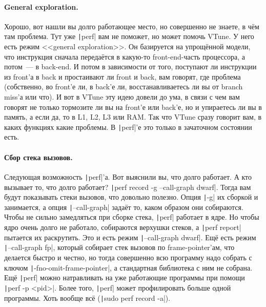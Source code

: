 \documentclass{article}
\begin{document}
    \paragraph{General exploration.}
    Хорошо, вот нашли вы долго работающее место, но совершенно не знаете, в чём там проблема. Тут уже \texttt|perf| вам не поможет, но может помочь VTune. У него есть режим <<general exploration>>. Он базируется на упрощённой модели, что инструкция сначала передаётся в какую-то front-end-часть процессора, а потом~--- в back-end. И потом в зависимости от того, поступают ли инструкции из front'а в back и простаивают ли front и back, вам говорят, где проблема (собственно, во front'е ли, в back'е ли, восстанавливаетесь ли вы от branch miss'а или что). И вот в VTune эту идею довели до ума, в связи с чем вам говорят не только тормозите ли вы на front'е или back'е, но и упираетесь ли вы в память, а если да, то в L1, L2, L3 или RAM. Так что VTune сразу говорит вам, в каких функциях какие проблемы. В \texttt|perf|'е это только в зачаточном состоянии есть.
    \paragraph{Сбор стека вызовов.}
    Следующая возможность \texttt|perf|'а. Вот выяснили вы, что долго работает. А кто вызывает то, что долго работает? \texttt|perf record -g --call-graph dwarf|. Тогда вам будут показывать стеки вызовов, что довольно полезно. Опция \texttt|-g| их сборкой и занимается, а опция \texttt|--call-graph| задаёт то, каком образом они собираются. Чтобы не сильно замедляться при сборке стека, \texttt|perf| работает в ядре. Но чтобы ядро очень долго не работало, собираются верхушки стеков, а \texttt|perf report| пытается их раскрутить. Это и есть режим \texttt|--call-graph dwarf|. Ещё есть режим \texttt|--call-graph fp|, который собирает стек вызовов по frame-pointer'ам, что делается быстро и честно, но тогда совершенно всю программу надо собрать с ключом \texttt|-fno-omit-frame-pointer|, а стандартная библиотека с ним не собрана.\\
    Ещё \texttt|perf| можно натравливать на уже работающие программы при помощи \texttt|perf -p <pid>|. Более того, \texttt|perf| может профилировать больше одной программы. Хоть вообще всё (\texttt|sudo perf record -a|).
\end{document}

